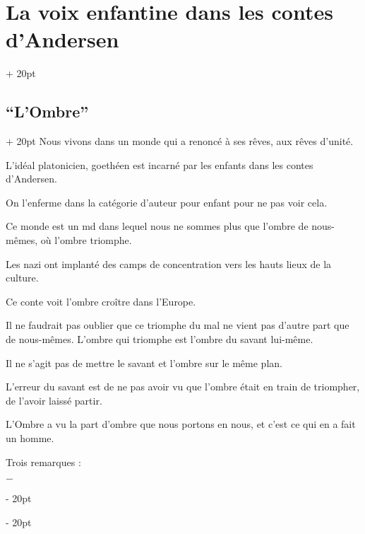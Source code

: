 \documentclass[a4paper, 12pt, twoside]{article}
\newcommand{\ind}[1][20pt]{\advance\leftskip + #1}
\newcommand{\deind}[1][20pt]{\advance\leftskip - #1}
\newenvironment{indt}[2][20pt]{#2 \par \ind[#1]}{\par \deind} %
\begin{document}
\begin{indt}{\section{La voix enfantine dans les contes d'Andersen}}
\begin{indt}{\subsection{``L'Ombre''}}
            Nous vivons dans un monde qui a renoncé à ses rêves, aux rêves d'unité.
            
            L'idéal platonicien, goethéen est incarné par les enfants dans les contes d'Andersen.
            
            On l'enferme dans la catégorie d'auteur pour enfant pour ne pas voir cela.
            
            Ce monde est un md dans lequel nous ne sommes plus que l'ombre de nous-mêmes, où l'ombre triomphe.
            
            Les nazi ont implanté des camps de concentration vers les hauts lieux de la culture.
            
            Ce conte voit l'ombre croître dans l'Europe.
            
            Il ne faudrait pas oublier que ce triomphe du mal ne vient pas d'autre part que  de nous-mêmes. L'ombre qui triomphe est l'ombre du savant lui-même.
            
            Il ne s'agit pas de mettre le savant et l'ombre sur le même plan.
            
            L'erreur du savant est de ne pas avoir vu que l'ombre était en train de triompher, de l'avoir laissé partir.
            
            
            L'Ombre a vu la part d'ombre que nous portons en nous, et c'est ce qui en a fait un homme.
            
            \vspace{12pt}
            
            Trois remarques :
            
            $-$
        \end{indt}
    \end{indt}

    
    
    
\end{document}
